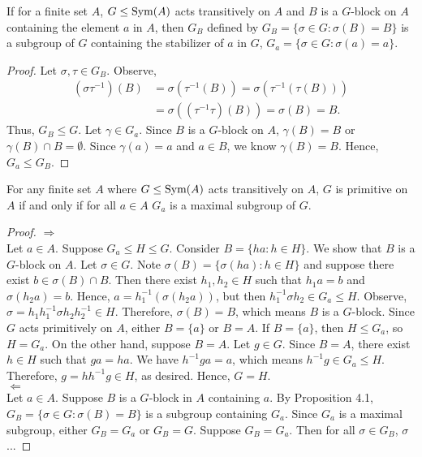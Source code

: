 \begin{proposition}
    If for a finite set $A$, $G\le\text{Sym}(A)$ acts transitively on $A$ and $B$ is a $G$-block on $A$ containing the element $a$ in $A$, then $G_B$ defined by $G_{B}=\{\sigma\in G:\sigma(B)=B\}$ is a subgroup of $G$ containing the stabilizer of $a$ in $G$, $G_a=\{\sigma\in G:\sigma(a)=a\}$.\cite[117]{dummit2004abstract}
\end{proposition}
\begin{proof}
Let $\sigma,\tau\in G_B$. Observe,
\begin{align*}
    (\sigma\tau^{-1})(B)&=\sigma(\tau^{-1}(B))=\sigma(\tau^{-1}(\tau(B)))\\
    &=\sigma((\tau^{-1}\tau)(B))=\sigma(B)=B.
\end{align*}
Thus, $G_B\le G$. Let $\gamma\in G_a$. Since $B$ is a $G$-block on $A$, $\gamma(B)=B$ or $\gamma(B)\cap B=\emptyset$. Since $\gamma(a)=a$ and $a\in B$, we know $\gamma(B)=B$. Hence, $G_a\le G_B$.
\end{proof}
\begin{proposition}
    For any finite set $A$ where $G\le\text{Sym}(A)$ acts transitively on $A$, $G$ is primitive on $A$ if and only if for all $a\in A$ $G_a$ is a maximal subgroup of $G$.\cite[117]{dummit2004abstract}  
\end{proposition}
\begin{proof}
    $\Rightarrow$\\Let $a\in A$. Suppose $G_a\le H\le G$. Consider $B=\{ha:h\in H\}$. We show that $B$ is a $G$-block on $A$. Let $\sigma\in G$. Note $\sigma(B)=\{\sigma(ha):h\in H\}$ and suppose there exist $b\in \sigma(B)\cap B$. Then there exist $h_1,h_2\in H$ such that $h_1a=b$ and $\sigma(h_2a)=b$. Hence, $a=h_1^{-1}(\sigma(h_2a))$, but then $h_1^{-1}\sigma h_2\in G_a\le H$. Observe, $\sigma=h_1h_1^{-1}\sigma h_2h_2^{-1}\in H$. Therefore, $\sigma(B)=B$, which means $B$ is a $G$-block. Since $G$ acts primitively on $A$, either $B=\{a\}$ or $B=A$. If $B=\{a\}$, then $H\le G_a$, so $H=G_a$. On the other hand, suppose $B=A$. Let $g\in G$. Since $B=A$, there exist $h\in H$ such that $ga=ha$. We have $h^{-1}ga=a$, which means $h^{-1}g\in G_a\le H$. Therefore, $g=hh^{-1}g\in H$, as desired. Hence,  $G=H$.\\
    $\Leftarrow$\\
    Let $a\in A$. Suppose $B$ is a $G$-block in $A$ containing $a$. By Proposition 4.1, $G_B=\{\sigma\in G:\sigma(B)=B\}$ is a subgroup containing $G_a$. Since $G_a$ is a maximal subgroup, either $G_B=G_a$ or $G_B=G$. Suppose $G_B=G_a$. Then for all $\sigma\in G_B$, $\sigma$...
\end{proof}
